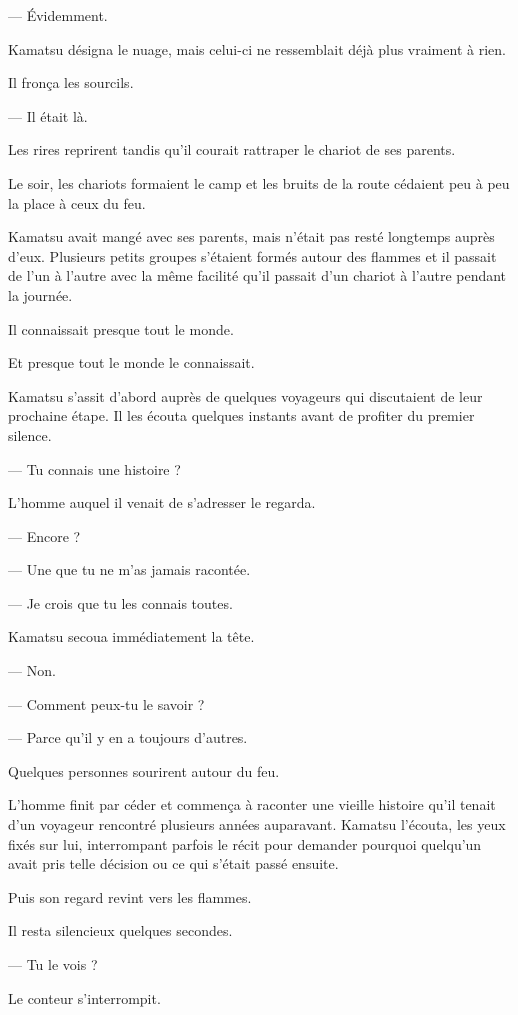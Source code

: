— Évidemment.

Kamatsu désigna le nuage, mais celui-ci ne ressemblait déjà plus vraiment à
rien.

Il fronça les sourcils.

— Il était là.

Les rires reprirent tandis qu'il courait rattraper le chariot de ses parents.

\scenebreak

Le soir, les chariots formaient le camp et les bruits de la route cédaient peu
à peu la place à ceux du feu.

Kamatsu avait mangé avec ses parents, mais n'était pas resté longtemps auprès
d'eux. Plusieurs petits groupes s'étaient formés autour des flammes et il
passait de l'un à l'autre avec la même facilité qu'il passait d'un chariot à
l'autre pendant la journée.

Il connaissait presque tout le monde.

Et presque tout le monde le connaissait.

Kamatsu s'assit d'abord auprès de quelques voyageurs qui discutaient de leur
prochaine étape. Il les écouta quelques instants avant de profiter du premier
silence.

— Tu connais une histoire ?

L'homme auquel il venait de s'adresser le regarda.

— Encore ?

— Une que tu ne m'as jamais racontée.

— Je crois que tu les connais toutes.

Kamatsu secoua immédiatement la tête.

— Non.

— Comment peux-tu le savoir ?

— Parce qu'il y en a toujours d'autres.

Quelques personnes sourirent autour du feu.

L'homme finit par céder et commença à raconter une vieille histoire qu'il
tenait d'un voyageur rencontré plusieurs années auparavant. Kamatsu l'écouta,
les yeux fixés sur lui, interrompant parfois le récit pour demander pourquoi
quelqu'un avait pris telle décision ou ce qui s'était passé ensuite.

Puis son regard revint vers les flammes.

Il resta silencieux quelques secondes.

— Tu le vois ?

Le conteur s'interrompit.

